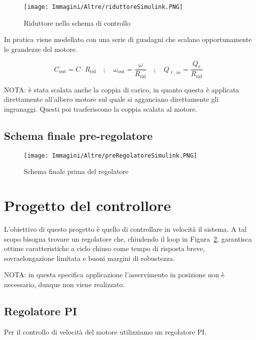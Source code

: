 \documentclass[a4paper,12pt]{article}
\begin{document}
\begin{figure}[h!]
\centering
    \texttt{[image: Immagini/Altre/riduttoreSimulink.PNG]}
    \caption{Riduttore nello schema di controllo}
    \label{fig:simulink_controllo_riduttore}
\end{figure}

\vspace{0.5cm}

In pratica viene modellato con una serie di guadagni che scalano opportunamente le grandezze del motore.

\[
C_{\text{out}} = C \cdot R_{\text{rid}} \quad ; \quad
\omega_{\text{out}} = \frac{\omega}{R_{\text{rid}}} \quad ; \quad
Q_{\ell,in} = \frac{Q_{\ell}}{R_{\text{rid}}}
\]

\vspace{0.5cm}
NOTA: è stata scalata anche la coppia di carico, in quanto questa è applicata direttamente all'albero motore sul quale si agganciano direttamente gli ingranaggi. Questi poi trasferiscono la coppia scalata al motore.


\subsection{Schema finale pre-regolatore}

\begin{figure}[h!]
\centering
    \texttt{[image: Immagini/Altre/preRegolatoreSimulink.PNG]}
    \caption{Schema finale prima del regolatore}
    \label{fig:simulink_pre_regolatore}
\end{figure}


\newpage

\section{Progetto del controllore}
L'obiettivo di questo progetto è quello di controllare in velocità il sistema. A tal scopo bisogna trovare un regolatore che, chiudendo il loop in Figura~\ref{fig:simulink_pre_regolatore}, garantisca ottime caratteristiche a ciclo chiuso come tempo di risposta breve, sovraelongazione limitata e buoni margini di robustezza.

NOTA: in questa specifica applicazione l'asservimento in posizione non è necessario, dunque non viene realizzato.

\subsection{Regolatore PI}
\label{specifiche2}
Per il controllo di velocità del motore utilizziamo un regolatore PI.
\end{document}
